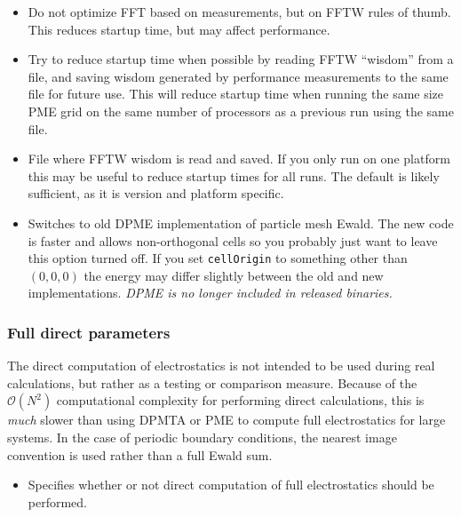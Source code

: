 \begin{itemize}
\item
{}
{Do not optimize FFT based on measurements, but on FFTW rules of thumb.
This reduces startup time, but may affect performance.}

\item
{}
{Try to reduce startup time when possible by reading FFTW ``wisdom'' from a file, and saving wisdom generated by performance measurements to the same file for future use.
This will reduce startup time when running the same size PME grid on the same number of processors as a previous run using the same file.}

\item
{}
{File where FFTW wisdom is read and saved.
If you only run on one platform this may be useful to reduce startup times for all runs.
The default is likely sufficient, as it is version and platform specific.}

\item
{}
{Switches to old DPME implementation of particle mesh Ewald.
The new code is faster and allows non-orthogonal cells so you
probably just want to leave this option turned off.  If you set
{\tt cellOrigin} to something other than $(0,0,0)$ the energy may differ
slightly between the old and new implementations.
{\em DPME is no longer included in released binaries.}
}

\end{itemize}

\subsubsection{Full direct parameters}

The direct computation of electrostatics 
is not intended to be used during 
real calculations, but rather as a testing or 
comparison measure.  Because of the ${\mathcal O}(N^2)$ 
computational complexity for performing 
direct calculations, this is {\it much} 
slower than using DPMTA or PME to compute full 
electrostatics for large systems.
In the case of periodic boundary conditions,
the nearest image convention is used rather than a
full Ewald sum.

\begin{itemize}

\item
{}
{Specifies whether or not direct computation of 
full electrostatics should be performed.}

\end{itemize}


